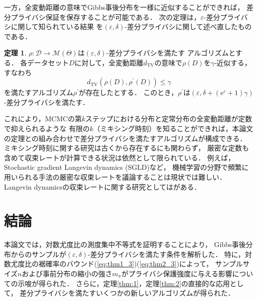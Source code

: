 \documentclass{jarticle}
\newcommand{\ee}{\mathrm{e}}
\theoremstyle{definition}
\newtheorem{thm}{定理}
\begin{document}
一方，全変動距離の意味でGibbs事後分布を一様に近似することができれば，
差分プライバシ保証を保存することが可能である．
次の定理は，$\varepsilon$-差分プライバシに関して知られている結果\cite{Wang2015b,Dwork2014}
を$(\varepsilon, \delta)$-差分プライバシに関して述べ直したものである．
\begin{thm}
\label{thm:3}
$\rho: \mathcal{D} \to \mathcal{M}(\Theta)$は$(\varepsilon, \delta)$-差分プライバシを満たす
アルゴリズムとする．
各データセット$D$に対して，全変動距離$d_\mathrm{TV}$の意味で$\rho(D)$を$\gamma$-近似する，
すなわち
\begin{equation}
d_\mathrm{TV}(\rho(D), \rho^\prime(D)) \leq \gamma
\end{equation}
を満たすアルゴリズム$\rho^\prime$が存在したとする．
このとき，$\rho^\prime$は$(\varepsilon, \delta + (\ee^\varepsilon + 1)\gamma)$-差分プライバシを満たす．
\end{thm}
これにより，MCMCの第$k$ステップにおける分布と定常分布の全変動距離が定数で抑えられるような
有限の$k$（ミキシング時刻）を知ることができれば，本論文の定理との組み合わせで差分プライバシを満たすアルゴリズムが構成できる．
ミキシング時刻に関する研究は古くから存在する\cite{Rosenthal1995}にも関わらず，
厳密な定数も含めて収束レートが計算できる状況は依然として限られている．
例えば，Stochastic gradient Langevin dynamics (SGLD)\cite{Welling2011,Sato2014}など，
機械学習の分野で頻繁に用いられる手法の厳密な収束レートを議論することは現状では難しい．
Langevin dynamicsの収束レートに関する研究としては\cite{BoHa2013}がある．

\section{結論}
本論文では，対数尤度比の測度集中不等式を証明することにより，
Gibbs事後分布からのサンプルが$(\varepsilon, \delta)$-差分プライバシを満たす条件を解析した．
特に，対数尤度比の裾確率のバウンド(\ref{eq:thm1_3})(\ref{eq:thm2_3})によって，
サンプルサイズ$n$および事前分布の縮小の強さ$m_\pi$がプライバシ保護強度に与える影響についての示唆が得られた．
さらに，定理\ref{thm:1}，定理\ref{thm:2}の直接的な応用として，
差分プライバシを満たすいくつかの新しいアルゴリズムが得られた．

\end{document}
